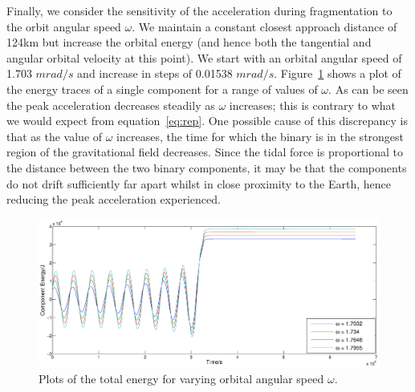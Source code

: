 \documentclass[letterpaper, preprint, paper,11pt]{AAS}	%
\begin{document}
 Finally, we consider the sensitivity of the acceleration during fragmentation to the orbit angular speed $\omega$. We maintain a constant closest approach distance of 124km but increase the orbital energy (and hence both the tangential and angular orbital velocity at this point). We start with an orbital angular speed of 1.703 $mrad/s$ and increase in steps of 0.01538 $mrad/s$. Figure~\ref{fig:omegasens} shows a plot of the energy traces of a single component for a range of values of $\omega$. As can be seen the peak acceleration decreases steadily as $\omega$ increases; this is contrary to what we would expect from equation~\ref{eq:rep}. One possible cause of this discrepancy is that as the value of $\omega$ increases, the time for which the binary is in the strongest region of the gravitational field decreases. Since the tidal force is proportional to the distance between the two binary components, it may be that the components do not drift sufficiently far apart whilst in close proximity to the Earth, hence reducing the peak acceleration experienced.
\begin{figure}[H]
\centering
\centerline{\includegraphics[width=1.1\textwidth]{omegasens.eps}} 
\caption{Plots of the total energy for varying orbital angular speed $\omega$.} 
\label{fig:omegasens}
\end{figure} 
\end{document}
